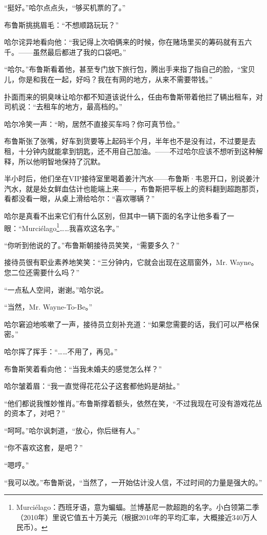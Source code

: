 \documentclass[../main]{subfiles}
\begin{document}
“挺好。”哈尔点点头，“够买机票的了。”

布鲁斯挑挑眉毛：“不想顺路玩玩？”

哈尔诧异地看向他：“我记得上次咱俩来的时候，你在赌场里买的筹码就有五六千。——虽然最后都进了我的口袋吧。”

“哈尔。”布鲁斯看着他，甚至专门放下旅行包，腾出手来指了指自己的脸，“宝贝儿，你是和我在一起，好吗？我在有网的地方，从来不需要带钱。”

扑面而来的铜臭味让哈尔都不知道该说什么，任由布鲁斯带着他拦了辆出租车，对司机说：“去租车的地方，最高档的。”

哈尔冷笑一声：“哟，居然不直接买车吗？你可真节俭。”

布鲁斯张了张嘴，好车到货要等上起码半个月，半年也不是没有过，不过要是去租，十分钟内就能拿到钥匙，还不用自己加油。——不过哈尔应该不想听到这种解释，所以他明智地保持了沉默。

半小时后，他们坐在VIP接待室里喝着姜汁汽水——布鲁斯·韦恩开口，别说姜汁汽水，就是处女鲜血估计也能端上来——，布鲁斯把平板上的资料翻到超跑那页，看都没看一眼，从桌上滑给哈尔：“喜欢哪辆？”

哈尔是真看不出来它们有什么区别，但其中一辆下面的名字让他多看了一眼：“Murciélago\footnote[1]{Murciélago：西班牙语，意为蝙蝠。兰博基尼一款超跑的名字。小白领第二季（2010年）里说它值五十万美元（根据2010年的平均汇率，大概接近340万人民币）。}……我喜欢这名字。”

“你听到他说的了。”布鲁斯朝接待员笑笑，“需要多久？”

接待员很有职业素养地笑笑：“三分钟内，它就会出现在这扇窗外，Mr.
Wayne。您二位还需要什么吗？”

“一点私人空间，谢谢。”哈尔说。

“当然，Mr. Wayne-To-Be。”

哈尔窘迫地咳嗽了一声，接待员立刻补充道：“如果您需要的话，我们可以严格保密。”

哈尔挥了挥手：“……不用了，再见。”

布鲁斯笑着看向他：“当我未婚夫的感觉怎么样？”

哈尔皱着眉：“我一直觉得花花公子这套都他妈是胡扯。”

“他们都说我惟妙惟肖。”布鲁斯撑着额头，依然在笑，“不过我现在可没有游戏花丛的资本了，对吧？”

“呵呵。”哈尔讽刺道，“放心，你后继有人。”

“你不喜欢这套，是吧？”

“嗯哼。”

“我可以改。”布鲁斯说，“当然了，一开始估计没人信，不过时间的力量是强大的。”
\end{document}
